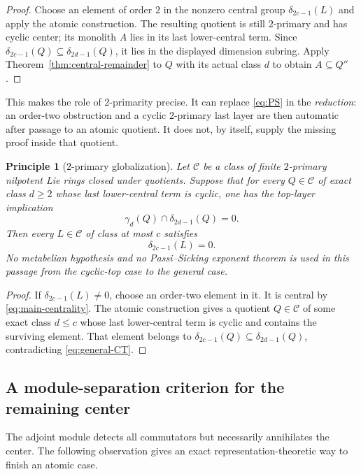 \documentclass[a4paper,11pt,reqno]{amsart}
\newtheorem{principle}[theorem]{Principle}
\theoremstyle{definition}
\theoremstyle{remark}
\newcommand{\dlt}{\delta}
\newcommand{\gm}{\gamma}
\begin{document}
\begin{proof}
Choose an element of order $2$ in the nonzero central group
$\dlt_{2c-1}(L)$ and apply the atomic construction.  The resulting quotient
is still $2$-primary and has cyclic center; its monolith $A$ lies in its last
lower-central term.  Since
$\dlt_{2c-1}(Q)\subseteq\dlt_{2d-1}(Q)$, it lies in the displayed dimension
subring.  Apply Theorem~\ref{thm:central-remainder} to $Q$ with its actual
class $d$ to obtain $A\subseteq Q''$.
\end{proof}

This makes the role of $2$-primarity precise.  It can replace
\eqref{eq:PS} in the \emph{reduction}: an order-two obstruction and a cyclic
$2$-primary last layer are then automatic after passage to an atomic quotient.
It does not, by itself, supply the missing proof inside that quotient.

\begin{principle}[$2$-primary globalization]\label{prin:2-globalization}
Let $\mathcal C$ be a class of finite $2$-primary nilpotent Lie rings closed
under quotients.  Suppose that for every $Q\in\mathcal C$ of exact class
$d\geq2$ whose last lower-central term is cyclic, one has the top-layer
implication
\begin{equation}\label{eq:general-CT}
        \gm_d(Q)\cap\dlt_{2d-1}(Q)=0.
\end{equation}
Then every $L\in\mathcal C$ of class at most $c$ satisfies
\[
                         \dlt_{2c-1}(L)=0.
\]
No metabelian hypothesis and no Passi--Sicking exponent theorem is used in
this passage from the cyclic-top case to the general case.
\end{principle}

\begin{proof}
If $\dlt_{2c-1}(L)\ne0$, choose an order-two element in it.  It is central by
\eqref{eq:main-centrality}.  The atomic construction gives a quotient
$Q\in\mathcal C$ of some exact class $d\leq c$ whose last lower-central term
is cyclic and contains the surviving element.  That element belongs to
$\dlt_{2c-1}(Q)\subseteq\dlt_{2d-1}(Q)$, contradicting
\eqref{eq:general-CT}.
\end{proof}

\subsection{A module-separation criterion for the remaining center}

The adjoint module detects all commutators but necessarily annihilates the
center.  The following observation gives an exact representation-theoretic
way to finish an atomic case.
\end{document}
